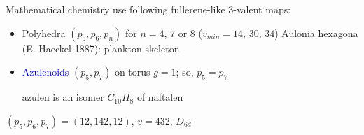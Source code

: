 \documentclass[%
pdf,
colorBG,
slideColor,
]{prosper}
\begin{document}
\begin{slide}{Mathematical chemistry}
use following fullerene-like $3$-valent maps:
\begin{itemize}
\item Polyhedra $(p_5, p_6, p_n)$ for $n=4$, $7$ or $8$ ($v_{min}=14$, $30$, $34$) Aulonia hexagona (E. Haeckel 1887): plankton skeleton
\item \textcolor{blue}{Azulenoids} $(p_5, p_7)$ on torus $g=1$; so, $p_5=p_7$\par
azulen  is an isomer $C_{10}H_{8}$ of naftalen 
\end{itemize}


\begin{center}
\begin{minipage}[b]{5.5cm}
\centering
{}\par
\end{minipage}
\hspace{0.1cm}
\begin{minipage}[b]{5.5cm}
\centering
{}\par
$(p_5, p_6, p_7)=(12, 142, 12)$, $v=432$, $D_{6d}$
\end{minipage}
\end{center}



\end{slide}
\end{document}
